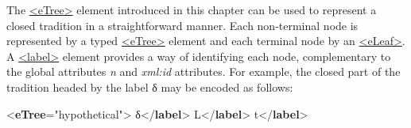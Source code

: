 The \hyperref[TEI.eTree]{<eTree>} element introduced in this chapter can be used to represent a closed tradition in a straightforward manner. Each non-terminal node is represented by a typed \hyperref[TEI.eTree]{<eTree>} element and each terminal node by an \hyperref[TEI.eLeaf]{<eLeaf>}. A \hyperref[TEI.label]{<label>} element provides a way of identifying each node, complementary to the global attributes {\itshape n} and {\itshape xml:id} attributes. For example, the closed part of the tradition headed by the label δ may be encoded as follows: \par\bgroup{}\exampleFont \begin{shaded}\noindent\mbox{}{<\textbf{eTree}\hspace*{1em}{type}="{hypothetical}">}\mbox{}\newline 
{}δ{</\textbf{label}>}\mbox{}\newline 
{}\mbox{}\newline 
\hspace*{1em}L{</\textbf{label}>}\mbox{}\newline 
{}\mbox{}\newline 
{}\mbox{}\newline 
\hspace*{1em}t{</\textbf{label}>}\mbox{}\newline 
{}\mbox{}\newline 

\end{shaded}
